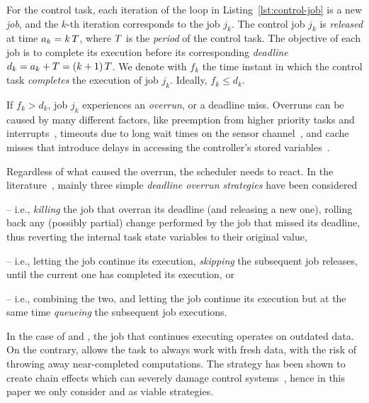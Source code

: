 For the control task, each iteration of the loop in Listing~\ref{lst:control-job} is a new \emph{job}, and the $k$-th iteration corresponds to the job $j_k$.
The control job $j_k$ is \emph{released} at time $a_k = k\,T$, where $T$ is the \emph{period} of the control task.
The objective of each job is to complete its execution before its corresponding \emph{deadline} $d_k = a_k + T = (k+1)\,T$.
We denote with $f_k$ the time instant in which the control task \emph{completes} the execution of job $j_k$.
Ideally, $f_k \leq d_k$.

If $f_k > d_k$, job $j_k$ experiences an \emph{overrun}, or a deadline miss.
Overruns can be caused by many different factors, like preemption from higher priority tasks and interrupts~\cite{Stankovic:1995}, timeouts due to long wait times on the sensor channel~\cite{Ohlin:2006}, and cache misses that introduce delays in accessing the controller's stored variables~\cite{Wang:2012}.

Regardless of what caused the overrun, the scheduler needs to react.
In the literature~\cite{Cervin:2005}, mainly three simple \emph{deadline overrun strategies} have been considered
%
\begin{enumerate*}[label=(\roman*)]
    \item \tK{} -- i.e., \emph{killing} the job that overran its deadline (and releasing a new one), rolling back any (possibly partial) change performed by the job that missed its deadline, thus reverting the internal task state variables to their original value,
    \item \tS{} -- i.e., letting the job continue its execution, \emph{skipping} the subsequent job releases, until the current one has completed its execution, or
    \item \tQ{} -- i.e., combining the two, and letting the job continue its execution but at the same time \emph{queueing} the subsequent job executions.
\end{enumerate*}
%
In the case of \tS{} and \tQ{}, the job that continues executing operates on outdated data.
On the contrary, \tK{} allows the task to always work with fresh data, with the risk of throwing away near-completed computations.
The \tQ{} strategy has been shown to create chain effects which can severely damage control systems~\cite{Cervin:2005, Maggio:2020}, hence in this paper we only consider \tK{} and \tS{} as viable strategies.


